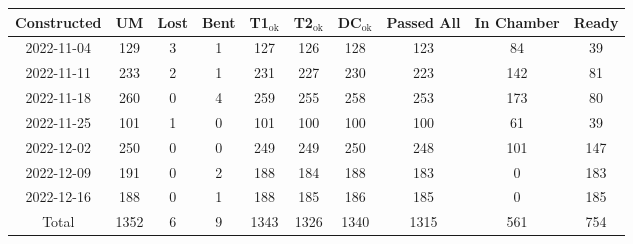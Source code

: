 \begin{tabular}{|c|c|c|c|c|c|c|c|c|c|}
\hline
Constructed &   UM &  Lost &  Bent &  T1$_\text{ok}$ &  T2$_\text{ok}$ &  DC$_\text{ok}$ &  Passed All &  In Chamber &  Ready \\\hline

 2022-11-04 &  129 &     3 &     1 &             127 &             126 &             128 &         123 &          84 &     39 \\\hline
 2022-11-11 &  233 &     2 &     1 &             231 &             227 &             230 &         223 &         142 &     81 \\\hline
 2022-11-18 &  260 &     0 &     4 &             259 &             255 &             258 &         253 &         173 &     80 \\\hline
 2022-11-25 &  101 &     1 &     0 &             101 &             100 &             100 &         100 &          61 &     39 \\\hline
 2022-12-02 &  250 &     0 &     0 &             249 &             249 &             250 &         248 &         101 &    147 \\\hline
 2022-12-09 &  191 &     0 &     2 &             188 &             184 &             188 &         183 &           0 &    183 \\\hline
 2022-12-16 &  188 &     0 &     1 &             188 &             185 &             186 &         185 &           0 &    185 \\\hline
      Total & 1352 &     6 &     9 &            1343 &            1326 &            1340 &        1315 &         561 &    754 \\\hline

\end{tabular}
